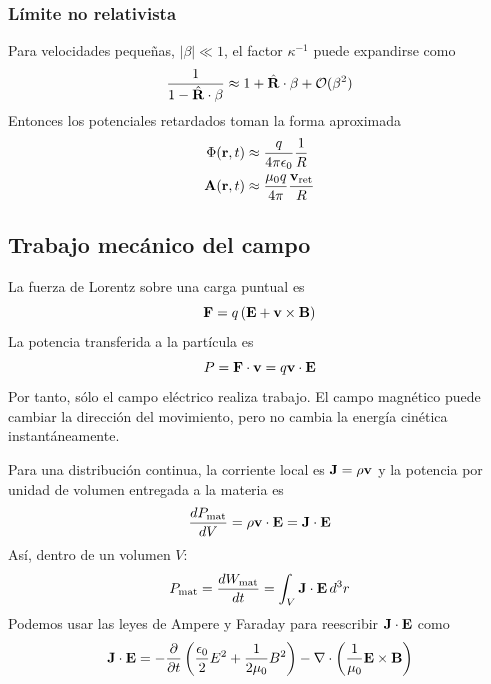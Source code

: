 \documentclass[]{article}
\numberwithin{equation}{section}
\begin{document}
\subsubsection{Límite no relativista}
Para velocidades pequeñas, \(|\beta| \ll 1 \), el factor \(\kappa^{-1}\) puede expandirse como
\begin{equation*}
	\frac{1}{1 - \hat{\mathbf{R}}\cdot\mathbf{\beta}} \approx 1 + \hat{\mathbf{R}}\cdot\beta + \mathcal{O}(\beta^2)
\end{equation*}
Entonces los potenciales retardados toman la forma aproximada
\begin{align*}
	\Phi(\rv,t) &\approx \ke[q] \frac{1}{R}\\
	\n{A}(\rv,t) &\approx \ku[q] \frac{\n{v}_{\mathrm{ret}}}{R	}
\end{align*}

\subsection{Trabajo mecánico del campo}
La fuerza de Lorentz sobre una carga puntual es
\begin{equation*}
	\mathbf{F} = q \left(\mathbf{E} + \mathbf{v}\times\mathbf{B}\right)
\end{equation*}
La potencia transferida a la partícula es
\begin{equation*}
	P = \mathbf{F}\cdot\mathbf{v} = q\mathbf{v}\cdot\mathbf{E}
\end{equation*}
Por tanto, sólo el campo eléctrico realiza trabajo. El campo magnético puede cambiar la dirección del movimiento, pero no cambia la energía cinética instantáneamente.

Para una distribución continua, la corriente local es \(\mathbf{J} = \rho\mathbf{v}\) y la potencia por unidad de volumen entregada a la materia es
\begin{equation*}
	\dfrac{d P_{\mathrm{mat}}}{d V} = \rho \mathbf{v}\cdot\mathbf{E} = \mathbf{J}\cdot\mathbf{E}
\end{equation*}
Así, dentro de un volumen \(V\):
\begin{equation}
	P_{\mathrm{mat}} = \dfrac{d W_{\mathrm{mat}}}{d t} = \int_{V} \mathbf{J}\cdot\mathbf{E} \, d^3r
\end{equation}
Podemos usar las leyes de Ampere y Faraday para reescribir \(\mathbf{J}\cdot\mathbf{E}\) como
\begin{equation}
	\mathbf{J}\cdot\mathbf{E} = -\dfrac{\partial }{\partial t} \left(\frac{\epsilon_{0}}{2} E^2 + \frac{1}{2\mu_{0}}B^2\right) - \nabla\cdot\left(\frac{1}{\mu_{0}} \mathbf{E}\times\mathbf{B}\right) \label{JE}
\end{equation}
\end{document}
